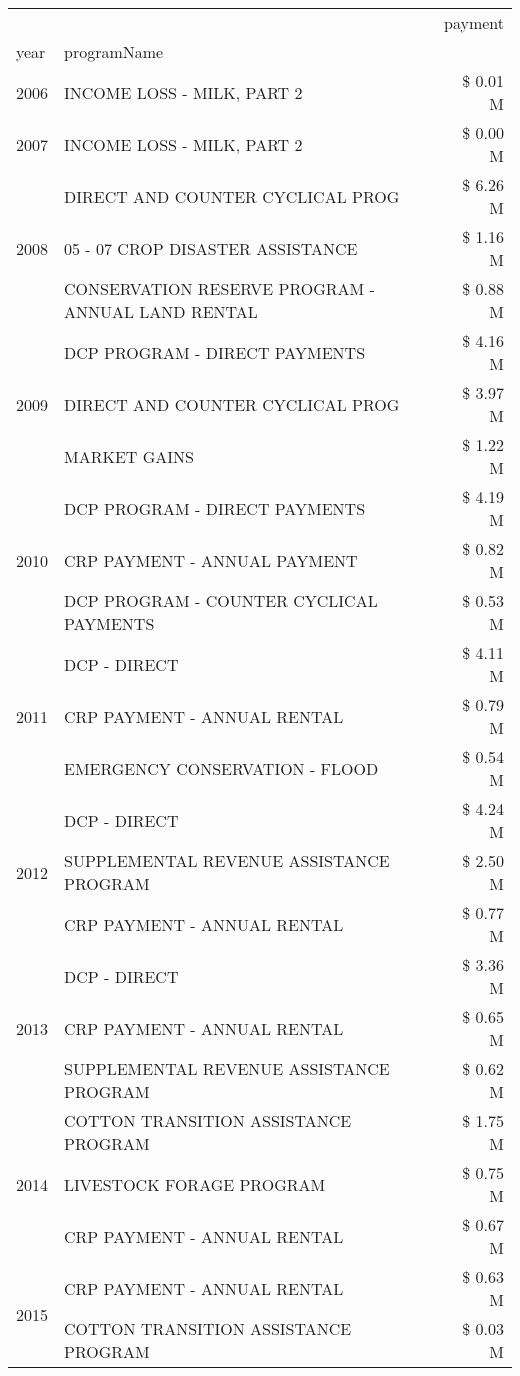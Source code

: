 \begin{tabular}{llr}
\toprule
 &  & payment \\
year & programName &  \\
\midrule
2006 & INCOME LOSS - MILK, PART 2 & \$ 0.01 M \\
\cline{1-3}
2007 & INCOME LOSS - MILK, PART 2 & \$ 0.00 M \\
\cline{1-3}
\multirow[t]{3}{*}{2008} & DIRECT AND COUNTER CYCLICAL PROG & \$ 6.26 M \\
 & 05 - 07 CROP DISASTER ASSISTANCE & \$ 1.16 M \\
 & CONSERVATION RESERVE PROGRAM - ANNUAL LAND RENTAL & \$ 0.88 M \\
\cline{1-3}
\multirow[t]{3}{*}{2009} & DCP PROGRAM - DIRECT PAYMENTS & \$ 4.16 M \\
 & DIRECT AND COUNTER CYCLICAL PROG & \$ 3.97 M \\
 & MARKET GAINS & \$ 1.22 M \\
\cline{1-3}
\multirow[t]{3}{*}{2010} & DCP PROGRAM - DIRECT PAYMENTS & \$ 4.19 M \\
 & CRP PAYMENT - ANNUAL PAYMENT & \$ 0.82 M \\
 & DCP PROGRAM - COUNTER CYCLICAL PAYMENTS & \$ 0.53 M \\
\cline{1-3}
\multirow[t]{3}{*}{2011} & DCP - DIRECT & \$ 4.11 M \\
 & CRP PAYMENT - ANNUAL RENTAL & \$ 0.79 M \\
 & EMERGENCY CONSERVATION - FLOOD & \$ 0.54 M \\
\cline{1-3}
\multirow[t]{3}{*}{2012} & DCP - DIRECT & \$ 4.24 M \\
 & SUPPLEMENTAL REVENUE ASSISTANCE PROGRAM & \$ 2.50 M \\
 & CRP PAYMENT - ANNUAL RENTAL & \$ 0.77 M \\
\cline{1-3}
\multirow[t]{3}{*}{2013} & DCP - DIRECT & \$ 3.36 M \\
 & CRP PAYMENT - ANNUAL RENTAL & \$ 0.65 M \\
 & SUPPLEMENTAL REVENUE ASSISTANCE PROGRAM & \$ 0.62 M \\
\cline{1-3}
\multirow[t]{3}{*}{2014} & COTTON TRANSITION ASSISTANCE PROGRAM & \$ 1.75 M \\
 & LIVESTOCK FORAGE PROGRAM & \$ 0.75 M \\
 & CRP PAYMENT - ANNUAL RENTAL & \$ 0.67 M \\
\cline{1-3}
\multirow[t]{3}{*}{2015} & CRP PAYMENT - ANNUAL RENTAL & \$ 0.63 M \\
 & COTTON TRANSITION ASSISTANCE PROGRAM & \$ 0.03 M \\

\end{tabular}
